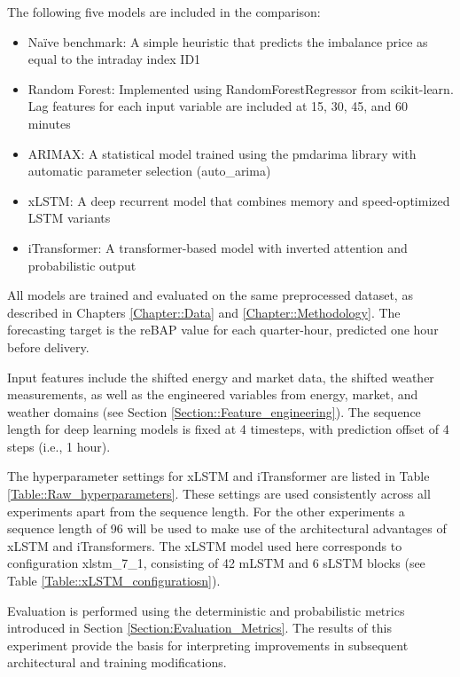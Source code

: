 \documentclass[class=scrbook, crop=false]{standalone}
\begin{document}
The following five models are included in the comparison:
\begin{itemize}
\item Naïve benchmark: A simple heuristic that predicts the imbalance price as equal to the intraday index ID1
\item Random Forest: Implemented using RandomForestRegressor from scikit-learn. Lag features for each input variable are included at 15, 30, 45, and 60 minutes
\item ARIMAX: A statistical model trained using the pmdarima library with automatic parameter selection (auto\_arima)
\item xLSTM: A deep recurrent model that combines memory and speed-optimized LSTM variants
\item iTransformer: A transformer-based model with inverted attention and probabilistic output
\end{itemize}

All models are trained and evaluated on the same preprocessed dataset, as described in Chapters \ref{Chapter::Data} and \ref{Chapter::Methodology}. The forecasting target is the reBAP value for each quarter-hour, predicted one hour before delivery.

Input features include the shifted energy and market data, the shifted weather measurements, as well as the engineered variables from energy, market, and weather domains (see Section \ref{Section::Feature_engineering}). The sequence length for deep learning models is fixed at 4 timesteps, with prediction offset of 4 steps (i.e., 1 hour).

The hyperparameter settings for xLSTM and iTransformer are listed in Table \ref{Table::Raw_hyperparameters}. These settings are used consistently across all experiments apart from the sequence length. For the other experiments a sequence length of 96 will be used to make use of the architectural advantages of xLSTM and iTransformers. The xLSTM model used here corresponds to configuration xlstm\_7\_1, consisting of 42 mLSTM and 6 sLSTM blocks (see Table \ref{Table::xLSTM_configuratiosn}). 

Evaluation is performed using the deterministic and probabilistic metrics introduced in Section \ref{Section:Evaluation_Metrics}. The results of this experiment provide the basis for interpreting improvements in subsequent architectural and training modifications.

\end{document}
